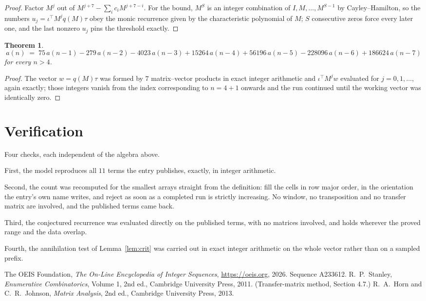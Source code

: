 \documentclass[11pt,a4paper]{article}
\theoremstyle{plain}
\newtheorem{theorem}{Theorem}
\theoremstyle{definition}
\begin{document}
\begin{proof}
Factor $M^{j}$ out of $M^{j+7}-\sum_ic_iM^{j+7-i}$. For the bound, $M^{S}$
is an integer combination of $I,M,\dots,M^{S-1}$ by Cayley--Hamilton, so the numbers
$u_j=\iota^{\!\top}M^{j}q(M)\tau$ obey the monic recurrence given by the characteristic
polynomial of $M$; $S$ consecutive zeros force every later one, and the last nonzero $u_j$
pins the threshold exactly.
\end{proof}

\begin{theorem}
\[
a(n)\;=\;75\,a(n-1) - 279\,a(n-2) - 4023\,a(n-3) + 15264\,a(n-4) + 56196\,a(n-5) - 228096\,a(n-6) + 186624\,a(n-7)
\]
for every $n>4$.
\end{theorem}

\begin{proof}
The vector $w=q(M)\tau$ was formed by $7$ matrix--vector products in exact integer
arithmetic and $\iota^{\!\top}M^{j}w$ evaluated for $j=0,1,\dots$, again exactly; those
integers vanish from the index corresponding to $n=4+1$ onwards and the run continued
until the working vector was identically zero.
\end{proof}

\section{Verification}

Four checks, each independent of the algebra above.

First, the model reproduces all $11$ terms the entry publishes, exactly, in integer
arithmetic.

Second, the count was recomputed for the smallest arrays straight from the definition: fill the
cells in row major order, in the orientation the entry's own name writes, and reject as soon as
a completed run is strictly increasing. No window, no transposition and no transfer matrix are involved, and
the published terms came back.

Third, the conjectured recurrence was evaluated directly on the published terms, with no
matrices involved, and holds wherever the proved range and the data overlap.

Fourth, the annihilation test of Lemma~\ref{lem:crit} was carried out in exact integer
arithmetic on the whole vector rather than on a sampled prefix.

\begin{thebibliography}{9}
 The OEIS Foundation, \emph{The On-Line Encyclopedia of Integer
Sequences}, \url{https://oeis.org}, 2026. Sequence A233612.
 R.~P.~Stanley, \emph{Enumerative Combinatorics}, Volume 1, 2nd ed.,
Cambridge University Press, 2011. (Transfer-matrix method, Section 4.7.)
 R.~A.~Horn and C.~R.~Johnson, \emph{Matrix Analysis}, 2nd ed., Cambridge
University Press, 2013.
\end{thebibliography}
\end{document}
